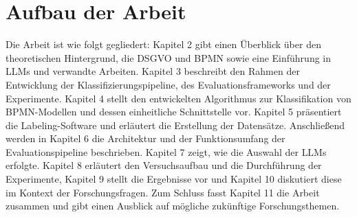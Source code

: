 \section{Aufbau der Arbeit}\label{sec:aufbau-der-arbeit}

Die Arbeit ist wie folgt gegliedert: Kapitel 2 gibt einen Überblick über den theoretischen Hintergrund, die \ac{DSGVO} und \ac{BPMN} sowie eine Einführung in \acp{LLM} und verwandte Arbeiten. Kapitel 3 beschreibt den Rahmen der Entwicklung der Klassifizierungspipeline, des Evaluationsframeworks und der Experimente. Kapitel 4 stellt den entwickelten Algorithmus zur Klassifikation von \ac{BPMN}-Modellen und dessen einheitliche Schnittstelle vor. Kapitel 5 präsentiert die Labeling-Software und erläutert die Erstellung der Datensätze. Anschließend werden in Kapitel 6 die Architektur und der Funktionsumfang der Evaluationspipeline beschrieben. Kapitel 7 zeigt, wie die Auswahl der \acp{LLM} erfolgte. Kapitel 8 erläutert den Versuchsaufbau und die Durchführung der Experimente, Kapitel 9 stellt die Ergebnisse vor und Kapitel 10 diskutiert diese im Kontext der Forschungsfragen. Zum Schluss fasst Kapitel 11 die Arbeit zusammen und gibt einen Ausblick auf mögliche zukünftige Forschungsthemen.